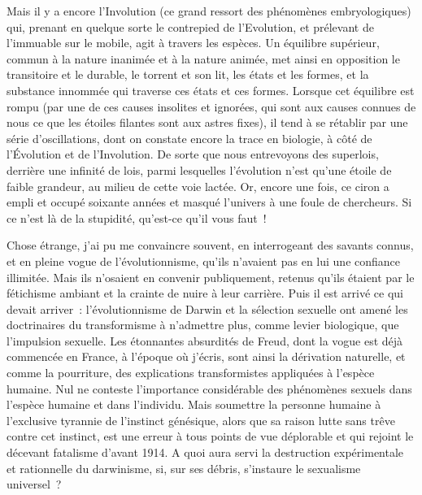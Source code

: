 \documentclass[french,twoside]{book} %
\begin{document}
Mais il y a encore l’Involution (ce grand ressort des phénomènes embryologiques) qui, prenant en quelque sorte le contrepied de l’Evolution, et prélevant de l’immuable sur le mobile, agit à travers les espèces. Un équilibre supérieur, commun à la nature inanimée et à la nature animée, met ainsi en opposition le transitoire et le durable, le torrent et son lit, les états et les formes, et la substance innommée qui traverse ces états et ces formes. Lorsque cet équilibre est rompu (par une de ces causes insolites et ignorées, qui sont aux causes connues de nous ce que les étoiles filantes sont aux astres fixes), il tend à se rétablir par une série d’oscillations, dont on constate encore la trace en biologie, à côté de l’Évolution et de l’Involution. De sorte que nous entrevoyons des superlois, derrière une infinité de lois, parmi lesquelles l’évolution n’est qu’une étoile de faible grandeur, au milieu de cette voie lactée. Or, encore une fois, ce ciron a empli et occupé soixante années et masqué l’univers à une foule de chercheurs. Si ce n’est là de la stupidité, qu’est-ce qu’il vous faut !\par
Chose étrange, j’ai pu me convaincre souvent, en interrogeant des savants connus, et en pleine vogue de l’évolutionnisme, qu’ils n’avaient pas en lui une confiance illimitée. Mais ils n’osaient en convenir publiquement, retenus qu’ils étaient par le fétichisme ambiant et la crainte de nuire à leur carrière. Puis il est arrivé ce qui devait arriver : l’évolutionnisme de Darwin et la sélection sexuelle ont amené les doctrinaires du transformisme à n’admettre plus, comme levier biologique, que l’impulsion sexuelle. Les étonnantes absurdités de Freud, dont la vogue est déjà commencée en France, à l’époque où j’écris, sont ainsi la dérivation naturelle, et comme la pourriture, des explications transformistes appliquées à l’espèce humaine. Nul ne conteste l’importance considérable des phénomènes sexuels dans l’espèce humaine et dans l’individu. Mais soumettre la personne humaine à l’exclusive tyrannie de l’instinct génésique, alors que sa raison lutte sans trêve contre cet instinct, est une erreur à tous points de vue déplorable et qui rejoint le décevant fatalisme d’avant 1914. A quoi aura servi la destruction expérimentale et rationnelle du darwinisme, si, sur ses débris, s’instaure le sexualisme universel ?\par
\end{document}
